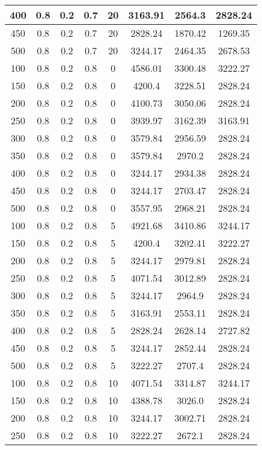 \documentclass[a4paper, 12pt]{extreport}
\begin{document}
\begin{itemize}
\begin{longtable}{|c|c|c|c|c|c|c|c|}
			400 & 0.8 & 0.2 & 0.7 & 20 & 3163.91 & 2564.3 & 2828.24 \\\hline
			450 & 0.8 & 0.2 & 0.7 & 20 & 2828.24 & 1870.42 & 1269.35 \\\hline
			500 & 0.8 & 0.2 & 0.7 & 20 & 3244.17 & 2464.35 & 2678.53 \\\hline
			100 & 0.8 & 0.2 & 0.8 & 0 & 4586.01 & 3300.48 & 3222.27 \\\hline
			150 & 0.8 & 0.2 & 0.8 & 0 & 4200.4 & 3228.51 & 2828.24 \\\hline
			200 & 0.8 & 0.2 & 0.8 & 0 & 4100.73 & 3050.06 & 2828.24 \\\hline
			250 & 0.8 & 0.2 & 0.8 & 0 & 3939.97 & 3162.39 & 3163.91 \\\hline
			300 & 0.8 & 0.2 & 0.8 & 0 & 3579.84 & 2956.59 & 2828.24 \\\hline
			350 & 0.8 & 0.2 & 0.8 & 0 & 3579.84 & 2970.2 & 2828.24 \\\hline
			400 & 0.8 & 0.2 & 0.8 & 0 & 3244.17 & 2934.38 & 2828.24 \\\hline
			450 & 0.8 & 0.2 & 0.8 & 0 & 3244.17 & 2703.47 & 2828.24 \\\hline
			500 & 0.8 & 0.2 & 0.8 & 0 & 3557.95 & 2968.21 & 2828.24 \\\hline
			100 & 0.8 & 0.2 & 0.8 & 5 & 4921.68 & 3410.86 & 3244.17 \\\hline
			150 & 0.8 & 0.2 & 0.8 & 5 & 4200.4 & 3202.41 & 3222.27 \\\hline
			200 & 0.8 & 0.2 & 0.8 & 5 & 3244.17 & 2979.81 & 2828.24 \\\hline
			250 & 0.8 & 0.2 & 0.8 & 5 & 4071.54 & 3012.89 & 2828.24 \\\hline
			300 & 0.8 & 0.2 & 0.8 & 5 & 3244.17 & 2964.9 & 2828.24 \\\hline
			350 & 0.8 & 0.2 & 0.8 & 5 & 3163.91 & 2553.11 & 2828.24 \\\hline
			400 & 0.8 & 0.2 & 0.8 & 5 & 2828.24 & 2628.14 & 2727.82 \\\hline
			450 & 0.8 & 0.2 & 0.8 & 5 & 3244.17 & 2852.44 & 2828.24 \\\hline
			500 & 0.8 & 0.2 & 0.8 & 5 & 3222.27 & 2707.4 & 2828.24 \\\hline
			100 & 0.8 & 0.2 & 0.8 & 10 & 4071.54 & 3314.87 & 3244.17 \\\hline
			150 & 0.8 & 0.2 & 0.8 & 10 & 4388.78 & 3026.0 & 2828.24 \\\hline
			200 & 0.8 & 0.2 & 0.8 & 10 & 3244.17 & 3002.71 & 2828.24 \\\hline
			250 & 0.8 & 0.2 & 0.8 & 10 & 3222.27 & 2672.1 & 2828.24 \\\hline

\end{longtable}
\end{itemize}
\end{document}
